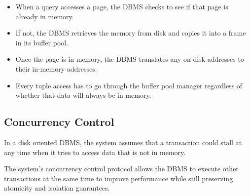\documentclass[11pt]{article}
\begin{document}
\begin{itemize}
    \item
    When a query accesses a page, the DBMS checks to see if that page is already in memory.
        
    \item
    If not, the DBMS retrieves the memory from disk and copies it into a frame in its 
    buffer pool.
        
    \item
    Once the page is in memory, the DBMS translates any on-disk addresses to their 
    in-memory addresses.
        
    \item
    Every tuple access has to go through the buffer pool manager regardless of whether 
    that data will always be in memory.
\end{itemize}
    
\subsection*{Concurrency Control}
In a disk oriented DBMS, the system assumes that a transaction could stall at any time when 
it tries to access data that is not in memory.
        
The system's concurrency control protocol allows the DBMS to execute other transactions at 
the same time to improve performance while still preserving atomicity and isolation 
guarantees.
        
\end{document}
